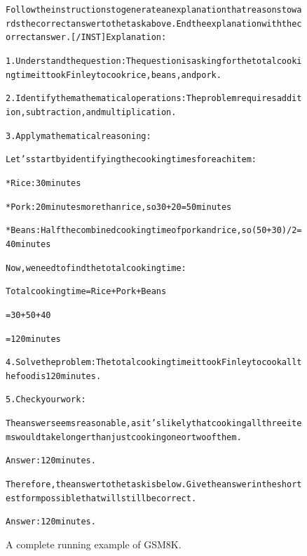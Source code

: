 \begin{figure}[t]
{{\begin{alltt}
Follow the instructions to generate an explanation that reasons towards the correct answer to the task above. End the explanation with the correct answer. [/INST] Explanation: 

1. Understand the question: The question is asking for the total cooking time it took Finley to cook rice, beans, and pork.

2. Identify the mathematical operations: The problem requires addition, subtraction, and multiplication.

3. Apply mathematical reasoning:

Let's start by identifying the cooking times for each item:

* Rice: 30 minutes

* Pork: 20 minutes more than rice, so 30 + 20 = 50 minutes

* Beans: Half the combined cooking time of pork and rice, so (50 + 30) / 2 = 40 minutes

Now, we need to find the total cooking time:

Total cooking time = Rice + Pork + Beans

= 30 + 50 + 40

= 120 minutes

4. Solve the problem: The total cooking time it took Finley to cook all the food is 120 minutes.

5. Check your work:

The answer seems reasonable, as it's likely that cooking all three items would take longer than just cooking one or two of them.

Answer: 120 minutes.

Therefore, the answer to the task is below. Give the answer in the shortest form possible that will still be correct.

Answer: 120 minutes.
\end{alltt}
}}
\caption{A complete running example of GSM8K.}
\label{fig:gsm_example}
\end{figure}
